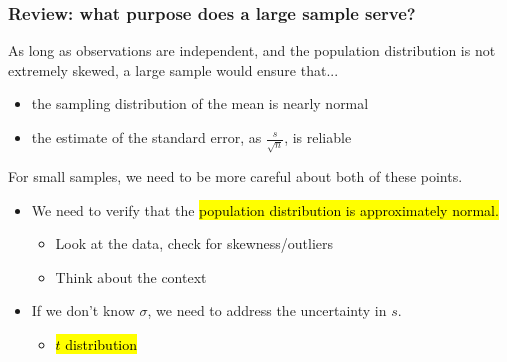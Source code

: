 \documentclass[slidestop,compress,mathserif]{beamer}
\begin{document}
\begin{frame}
\frametitle{Review: what purpose does a large sample serve?}

As long as observations are independent, and the population distribution is not extremely skewed, a large sample would ensure that...

\begin{itemize}

\item the sampling distribution of the mean is nearly normal

\item the estimate of the standard error, as $\frac{s}{\sqrt{n}}$, is reliable

\end{itemize}

\pause
For small samples, we need to be more careful about both of these points.

\begin{itemize}
\item We need to verify that the \hl{population distribution is approximately normal.}
\begin{itemize}
\item Look at the data, check for skewness/outliers
\item Think about the context
\end{itemize}
\item If we don't know $\sigma$, we need to address the uncertainty in $s$.
\begin{itemize}
\item \hl{$t$ distribution}
\end{itemize}
\end{itemize}

\end{frame}



\end{document}
